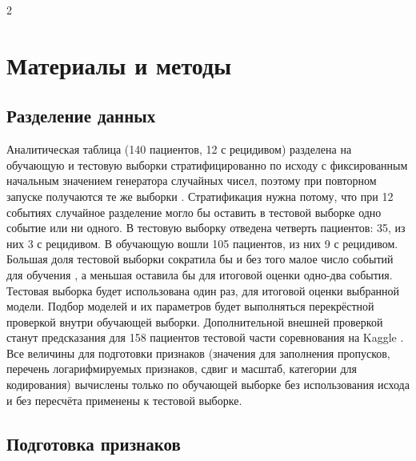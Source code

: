 \documentclass[11pt, a4paper]{article}
\begin{document}
\thispagestyle{firstpage}

\begin{multicols}{2}
\section*{Материалы и методы}

\subsection*{Разделение данных}

Аналитическая таблица (140 пациентов, 12 с рецидивом) разделена на обучающую и тестовую выборки стратифицированно по исходу с фиксированным начальным значением генератора случайных чисел, поэтому при повторном запуске получаются те же выборки \cite{Pedregosa2011}. Стратификация нужна потому, что при 12 событиях случайное разделение могло бы оставить в тестовой выборке одно событие или ни одного. В тестовую выборку отведена четверть пациентов: 35, из них 3 с рецидивом. В обучающую вошли 105 пациентов, из них 9 с рецидивом. Большая доля тестовой выборки сократила бы и без того малое число событий для обучения \cite{Riley2020}, а меньшая оставила бы для итоговой оценки одно-два события.\vspace{6pt}\\
Тестовая выборка будет использована один раз, для итоговой оценки выбранной модели. Подбор моделей и их параметров будет выполняться перекрёстной проверкой внутри обучающей выборки. Дополнительной внешней проверкой станут предсказания для 158 пациентов тестовой части соревнования на Kaggle \cite{KaggleOPC}. Все величины для подготовки признаков (значения для заполнения пропусков, перечень логарифмируемых признаков, сдвиг и масштаб, категории для кодирования) вычислены только по обучающей выборке без использования исхода и без пересчёта применены к тестовой выборке.

\subsection*{Подготовка признаков}


\end{multicols}
\end{document}
